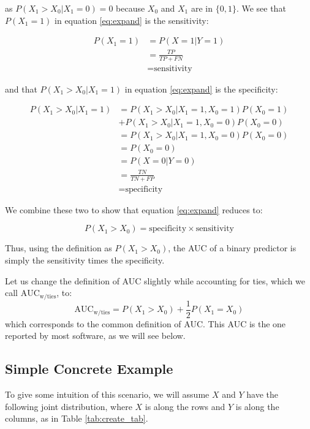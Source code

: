 \documentclass[article]{jss}
\begin{document}
as \(P(X_{1} > X_{0} | X_{1} = 0) = 0\) because \(X_{0}\) and \(X_{1}\)
are in \(\{0, 1\}\). We see that \(P(X_{1} = 1)\) in equation
\eqref{eq:expand} is the sensitivity:

\begin{align*}
P(X_{1} = 1) &= P(X = 1 | Y = 1)\\
&= \frac{TP}{TP + FN} \\
&= \text{sensitivity}
\end{align*}

and that \(P(X_{1} > X_{0} | X_{1} = 1)\) in equation \eqref{eq:expand}
is the specificity:

\begin{align*}
P(X_{1} > X_{0} | X_{1} = 1) &= P(X_{1} > X_{0} | X_{1} = 1, X_{0} =1) P(X_{0} = 1) \\
&+ P(X_{1} > X_{0} | X_{1} = 1, X_{0} =0) P(X_{0} = 0) \\
&= P(X_{1} > X_{0} | X_{1} = 1, X_{0} =0) P(X_{0} = 0) \\
&= P(X_{0} = 0) \\
&= P(X = 0 | Y = 0)\\
&= \frac{TN}{TN + FP} \\
&= \text{specificity}
\end{align*}

We combine these two to show that equation \eqref{eq:expand} reduces to:

\[
P(X_{1} > X_{0}) = \text{specificity} \times \text{sensitivity}
\]

Thus, using the definition as \(P(X_{1} > X_{0})\), the AUC of a binary
predictor is simply the sensitivity times the specificity.

Let us change the definition of AUC slightly while accounting for ties,
which we call \(\text{AUC}_{\text{w/ties}}\), to: \[
\text{AUC}_{\text{w/ties}} = P(X_{1} > X_{0}) + \frac{1}{2} P(X_{1} = X_{0})
\] which corresponds to the common definition of AUC. This AUC is the
one reported by most software, as we will see below.

\hypertarget{simple-concrete-example}{%
\subsection{Simple Concrete Example}\label{simple-concrete-example}}

To give some intuition of this scenario, we will assume \(X\) and \(Y\)
have the following joint distribution, where \(X\) is along the rows and
\(Y\) is along the columns, as in Table \ref{tab:create_tab}.
\end{document}
